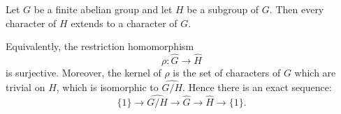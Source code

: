Let $G$ be a finite abelian group and let $H$ be a subgroup of $G$. Then every character of $H$ extends to a character of $G$.

Equivalently, the restriction homomorphism
$$\rho \colon \widehat{G} \longrightarrow \widehat{H}$$
is surjective. Moreover, the kernel of $\rho$ is the set of characters of $G$ which are trivial on $H$, which is isomorphic to $\widehat{G/H}$. Hence there is an exact sequence:
$$\{1\} \longrightarrow \widehat{G/H} \longrightarrow \widehat{G} \longrightarrow \widehat{H} \longrightarrow \{1\}.$$
